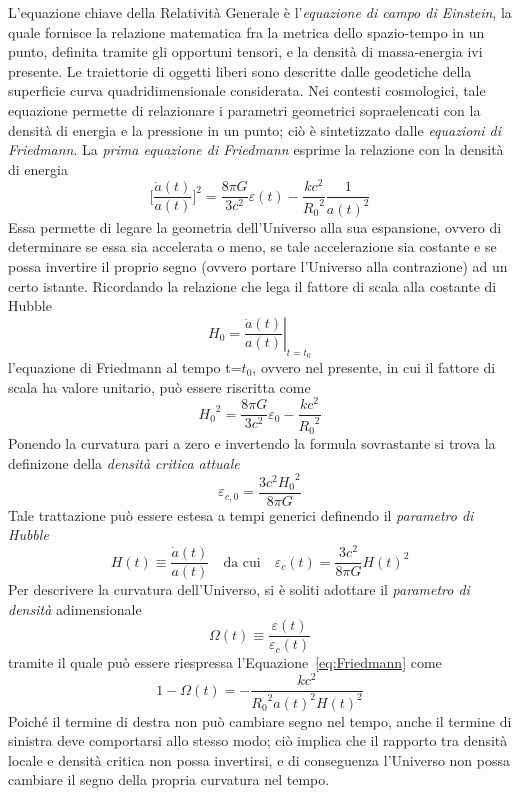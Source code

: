 L'equazione chiave della Relatività Generale è l'\emph{equazione di campo di Einstein}, la quale fornisce la relazione matematica fra la metrica dello spazio-tempo in un punto, definita tramite gli opportuni tensori, e la densità di massa-energia ivi presente.
Le traiettorie di oggetti liberi sono descritte dalle geodetiche della superficie curva quadridimensionale considerata.
Nei contesti cosmologici, tale equazione permette di relazionare i parametri geometrici sopraelencati con la densità di energia e la pressione in un punto; ciò è sintetizzato dalle \emph{equazioni di Friedmann}.
La \emph{prima equazione di Friedmann} esprime la relazione con la densità di energia
\begin{equation}
    \Bigg[\frac{\dot{a}(t)}{a(t)}\Bigg]^2=\frac{8\pi G}{3c^2}\varepsilon (t)-\frac{kc^2}{{R_0}^2}\frac{1}{a(t)^2}
    \label{eq:Friedmann}
\end{equation}
Essa permette di legare la geometria dell'Universo alla sua espansione, ovvero di determinare se essa sia accelerata o meno, se tale accelerazione sia costante e se possa invertire il proprio segno (ovvero portare l'Universo alla contrazione) ad un certo istante.
Ricordando la relazione che lega il fattore di scala alla costante di Hubble
\begin{equation}
    H_0 = \left. \frac{\dot{a}(t)}{a(t)}\right|_{t=t_0}
\end{equation}
l'equazione di Friedmann al tempo t=$t_0$, ovvero nel presente, in cui il fattore di scala ha valore unitario, può essere riscritta come
\begin{equation}
    {H_0}^2=\frac{8\pi G}{3c^2}\varepsilon_0-\frac{kc^2}{{R_0}^2}
\end{equation}
Ponendo la curvatura pari a zero e invertendo la formula sovrastante si trova la definizone della \emph{densità critica attuale}
\begin{equation}
    \varepsilon_{c,0}=\frac{3c^2{H_0}^2}{8\pi G}
\end{equation}
Tale trattazione può essere estesa a tempi generici definendo il \emph{parametro di Hubble}
\begin{equation}
    H(t) \equiv \frac{\dot{a}(t)}{a(t)}
    \quad \text{da cui} \quad
    \varepsilon_c(t) = \frac{3c^2}{8\pi G} H(t)^2
\end{equation}
Per descrivere la curvatura dell'Universo, si è soliti adottare il \emph{parametro di densità} adimensionale
\begin{equation}
    \Omega(t) \equiv \frac{\varepsilon(t)}{\varepsilon_c(t)}
\end{equation}
tramite il quale può essere riespressa l'Equazione~\ref{eq:Friedmann} come
\begin{equation}
    1-\Omega(t)=-\frac{kc^2}{{R_0}^2a(t)^2H(t)^2}
\end{equation}
Poiché il termine di destra non può cambiare segno nel tempo, anche il termine di sinistra deve comportarsi allo stesso modo; ciò implica che il rapporto tra densità locale e densità critica non possa invertirsi, e di conseguenza l'Universo non possa cambiare il segno della propria curvatura nel tempo.

